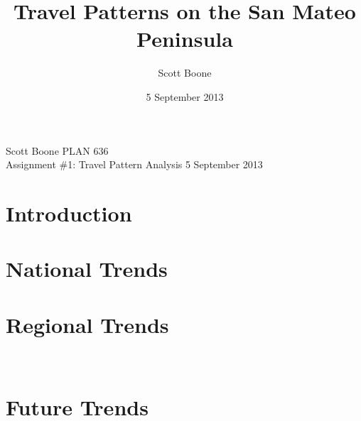 \documentclass[11pt]{article}
\title{Travel Patterns on the San Mateo Peninsula}
\date{5 September 2013}
\author{Scott Boone}
\begin{document}
\thispagestyle{empty} 			%
Scott Boone  \hfill PLAN 636\\
Assignment \#1: Travel Pattern Analysis \hfill 5 September 2013\\
\section{Introduction}
\lipsum[1-10]
\section{National Trends}
\lipsum[2]
\section{Regional Trends}
\lipsum[3]~\citep{schrank2007urban}
\section{Future Trends}
\lipsum[4]~\citep{pisarski2006commuting}





\end{document}
